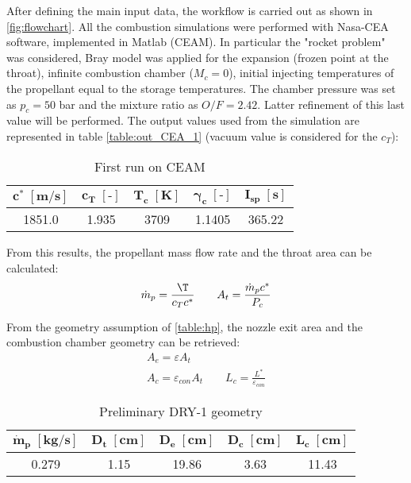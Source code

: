 After defining the main input data, the workflow is carried out as shown in \autoref{fig:flowchart}. All the combustion simulations were performed with Nasa-CEA software, implemented in Matlab (CEAM). In particular the "rocket problem" was considered, Bray model was applied for the expansion (frozen point at the throat), infinite combustion chamber ($M_c = 0$), initial injecting temperatures of the propellant equal to the storage temperatures. The chamber pressure was set as $p_c = 50$ bar and the mixture ratio as $O/F = 2.42$. Latter refinement of this last value will be performed. The output values used from the simulation are represented in table \autoref{table:out_CEA_1} (vacuum value is considered for the $c_T$):
\begin{table}[H]
    \renewcommand{\arraystretch}{1.2}
    \centering
    \begin{tabular}{|c|c|c|c|c|}
        \hline
        $\boldsymbol{c^* \; [\textbf{m/s}]}$ & $\boldsymbol{c_T \; [\textbf{-}]}$ & $\boldsymbol{T_c \; [\textbf{K}]}$ & $\boldsymbol{\gamma_c \; [\textbf{-}]}$ & $\boldsymbol{I_{sp} \; [\textbf{s}]}$ \\
        \hline
        \hline
        1851.0 & 1.935 & 3709 & 1.1405 & 365.22 \\
        \hline
    \end{tabular}
    \caption{First run on CEAM}
    \label{table:out_CEA_1}
\end{table}

From this results, the propellant mass flow rate and the throat area can be calculated:
\begin{equation}
    \dot{m}_p = \frac{\T}{c_T c^*} 
    \qquad 
    A_t = \frac{\dot{m}_p c^*}{P_c}
\end{equation}

From the geometry assumption of \autoref{table:hp}, the nozzle exit area and the combustion chamber geometry can be retrieved:
\begin{gather}
    A_e = \varepsilon A_t
    \\
    A_c = \varepsilon_{con} A_t \qquad L_c = \frac{L^*}{\varepsilon_{con}}
\end{gather}

\begin{table}[H]
    \renewcommand{\arraystretch}{1.2}
    \centering
    \begin{tabular}{|c|c|c|c|c|}
        \hline
        $\boldsymbol{\dot{m}_p \; [\textbf{kg/s}]}$ & $\boldsymbol{D_t \; [\textbf{cm}]}$ & $\boldsymbol{D_e \; [\textbf{cm}]}$  & $\boldsymbol{D_{c} \; [\textbf{cm}]}$ & $\boldsymbol{L_c \; [\textbf{cm}]}$ \\
        \hline
        \hline
        0.279 & 1.15 & 19.86 & 3.63 & 11.43 \\
        \hline
    \end{tabular}
    \caption{Preliminary DRY-1 geometry}
    \label{table:preliminary_dry}
\end{table}

